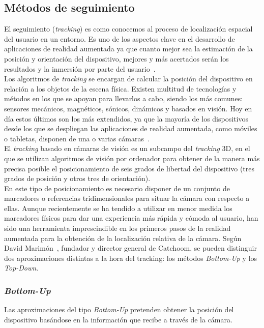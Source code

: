 \newpage
\subsection{Métodos de seguimiento}
El seguimiento (\textit{tracking}) es como conocemos al proceso de localización espacial del usuario en un entorno. Es uno de los aspectos clave en el desarrollo de aplicaciones de realidad aumentada ya que cuanto mejor sea la estimación de la posición y orientación del dispositivo, mejores y más acertados serán los resultados y la inmersión por parte del usuario~\cite{BostanciTrackingMethods}.\\

Los algoritmos de \textit{tracking} se encargan de calcular la posición del dispositivo en relación a los objetos de la escena física. Existen multitud de tecnologías y métodos en los que se apoyan para llevarlos a cabo, siendo los más comunes: sensores mecánicos, magnéticos, sónicos, dinámicos y basados en visión. Hoy en día estos últimos son los más extendidos, ya que la mayoría de los dispositivos desde los que se despliegan las aplicaciones de realidad aumentada, como móviles o tabletas, disponen de una o varias cámaras~\cite{ARToolkit}.\\

El \textit{tracking} basado en cámaras de visión es un subcampo del \textit{tracking} 3D, en el que se utilizan algoritmos de visión por ordenador para obtener de la manera más precisa posible el posicionamiento de seis grados de libertad del dispositivo (tres grados de posición y otros tres de orientación).\\

En este tipo de posicionamiento es necesario disponer de un conjunto de marcadores o referencias tridimensionales para situar la cámara con respecto a ellas. Aunque recientemente se ha tendido a utilizar en menor medida los marcadores físicos para dar una experiencia más rápida y cómoda al usuario, han sido una herramienta imprescindible en los primeros pasos de la realidad aumentada para la obtención de la localización relativa de la cámara.
Según David Marimón~\cite{TrackingThesis}, fundador y director general de Catchoom, se pueden distinguir dos aproximaciones distintas a la hora del tracking: los métodos \textit{Bottom-Up} y los \textit{Top-Down}. 

\subsubsection{\textit{Bottom-Up}}
Las aproximaciones del tipo\textit{ Bottom-Up }pretenden obtener la posición del dispositivo basándose en la información que recibe a través de la cámara.\\

